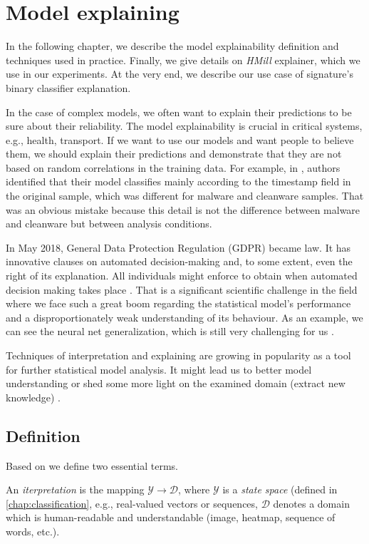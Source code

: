 \chapter{Model explaining} \label{chap:expth}
In the following chapter, we describe the model explainability definition and techniques used in practice. Finally, we give details on \emph{HMill} explainer, which we use in our experiments. At the very end, we describe our use case of signature's binary classifier explanation.

In the case of complex models, we often want to explain their predictions to be sure about their reliability. The model explainability is crucial in critical systems, e.g., health, transport. If we want to use our models and want people to believe them, we should explain their predictions and demonstrate that they are not based on random correlations in the training data. For example, in \cite{Pevny2020}, authors identified that their model classifies mainly according to the timestamp field in the original sample, which was different for malware and cleanware samples. That was an obvious mistake because this detail is not the difference between malware and cleanware but between analysis conditions.

In May 2018, General Data Protection Regulation (GDPR) became law. It has innovative clauses on automated decision-making and, to some extent, even the right of its explanation. All individuals might enforce to obtain  when automated decision making takes place \cite{Guidotti2018}. That is a significant scientific challenge in the field where we face such a great boom regarding the statistical model's performance and a disproportionately weak understanding of its behaviour. As an example, we can see the neural net generalization, which is still very challenging for us \cite{Zhang2016}.

Techniques of interpretation and explaining are growing in popularity as a tool for further statistical model analysis. It might lead us to better model understanding or shed some more light on the examined domain (extract new knowledge) \cite{Montavon2018}.

\section{Definition}
Based on \cite{Montavon2018} we define two essential terms.
\begin{definition}
An \emph{iterpretation} is the mapping $\mathcal{Y}\rightarrow\mathcal{D}$, where $\mathcal{Y}$ is a \emph{state space} (defined in \ref{chap:classification}, e.g., real-valued vectors or sequences,  $\mathcal{D}$ denotes a domain which is human-readable and understandable (image, heatmap, sequence of words, etc.).
\end{definition}


